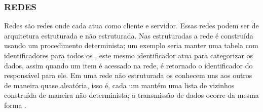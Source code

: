 \subsubsection{REDES }

Redes  são redes onde cada  atua como cliente e servidor. Essas redes podem ser de arquitetura estruturada e não estruturada. Nas estruturadas a rede é construída usando um procedimento determinista; um exemplo seria manter uma tabela com identificadores para todos os , este mesmo identificador atua para categorizar os dados, assim quando um item é acessado na rede, é retornado o identificador do  responsável para ele. Em uma rede não estruturada os  conhecem uns aos outros de maneira quase aleatória, isso é, cada um mantém uma lista de vizinhos construída de maneira não determinista; a transmissão de dados ocorre da mesma forma \cite{tanenbaum2007dist}.
